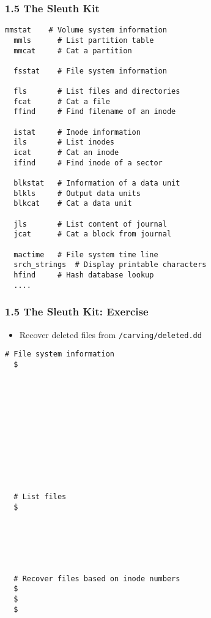 \begin{frame}[fragile]
  \frametitle{1.5 The Sleuth Kit}
  \begin{lstlisting}[basicstyle=\tiny\ttfamily]
  mmstat	# Volume system information
  mmls		# List partition table
  mmcat		# Cat a partition

  fsstat	# File system information

  fls		# List files and directories
  fcat		# Cat a file
  ffind		# Find filename of an inode

  istat		# Inode information
  ils		# List inodes
  icat		# Cat an inode
  ifind		# Find inode of a sector

  blkstat	# Information of a data unit
  blkls		# Output data units
  blkcat	# Cat a data unit

  jls		# List content of journal
  jcat		# Cat a block from journal

  mactime	# File system time line
  srch_strings	# Display printable characters
  hfind		# Hash database lookup
  ....
  \end{lstlisting}
\end{frame}


\begin{frame}[fragile]
  \frametitle{1.5 The Sleuth Kit: Exercise}
    \begin{itemize}
        \item[] Recover deleted files from \texttt{/carving/deleted.dd}
    \end{itemize}
  \begin{lstlisting}[basicstyle=\tiny\ttfamily]
  # File system information
  $ 












  # List files
  $ 






  # Recover files based on inode numbers
  $ 
  $ 
  $ 
  \end{lstlisting}
\end{frame}


